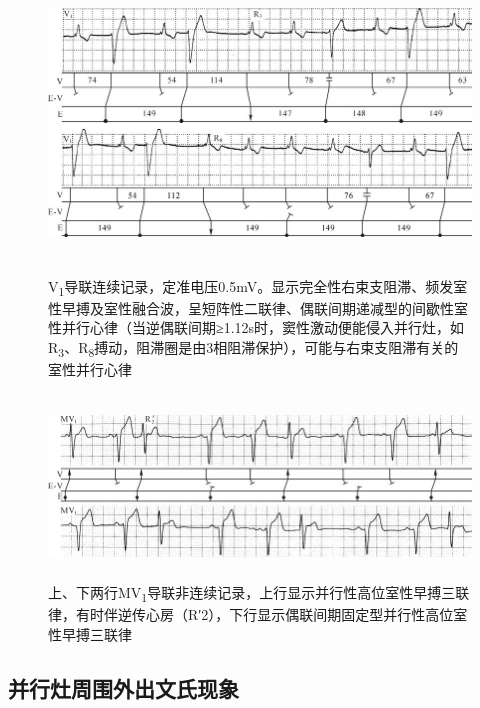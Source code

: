 \begin{figure}[!htbp]
 \centering
 \includegraphics[width=5.77083in,height=3.11458in]{./images/Image00293.jpg}
 \captionsetup{justification=centering}
 \caption{V\textsubscript{1}导联连续记录，定准电压0.5mV。显示完全性右束支阻滞、频发室性早搏及室性融合波，呈短阵性二联律、偶联间期递减型的间歇性室性并行心律（当逆偶联间期≥1.12s时，窦性激动便能侵入并行灶，如R\textsubscript{3}、R\textsubscript{8}搏动，阻滞圈是由3相阻滞保护），可能与右束支阻滞有关的室性并行心律}
 \label{fig16-17}
  \end{figure} 


\begin{figure}[!htbp]
 \centering
 \includegraphics[width=5.73958in,height=1.92708in]{./images/Image00294.jpg}
 \captionsetup{justification=centering}
 \caption{上、下两行MV\textsubscript{1}导联非连续记录，上行显示并行性高位室性早搏三联律，有时伴逆传心房（R′2），下行显示偶联间期固定型并行性高位室性早搏三联律}
 \label{fig16-18}
  \end{figure} 


\protect\hypertarget{text00023.htmlux5cux23subid293}{}{}

\subsection{并行灶周围外出文氏现象}

